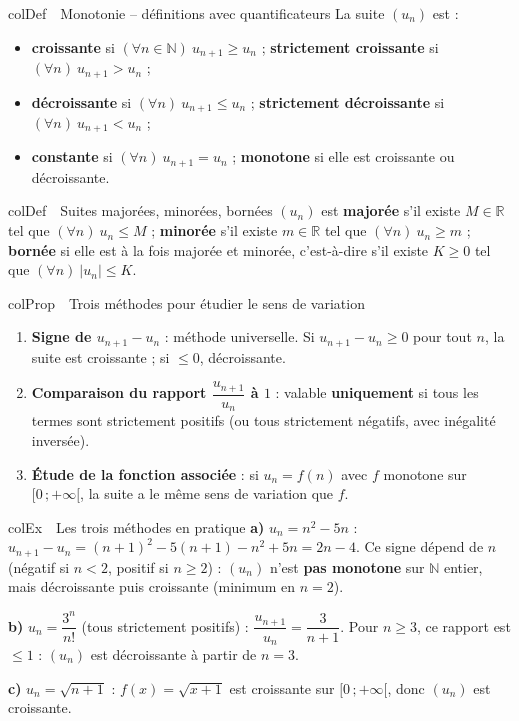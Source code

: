 \documentclass[11pt,a4paper]{article}
\newenvironment{definition}[1][Définition]
  {\begin{fiche}{colDef}{\ding{110}~~#1}}{\end{fiche}}
\newenvironment{propriete}[1][Propriété]
  {\begin{fiche}{colProp}{\ding{72}~~#1}}{\end{fiche}}
\newenvironment{exemple}[1][Exemple]
  {\begin{fiche}{colEx}{\ding{217}~~#1}}{\end{fiche}}
\begin{document}
\begin{definition}[Monotonie -- définitions avec quantificateurs]
La suite $(u_n)$ est :
\begin{itemize}[leftmargin=6mm, itemsep=0.5mm]
  \item \textbf{croissante} si $(\forall n \in \mathbb{N})\ u_{n+1} \geq u_n$ ; \textbf{strictement croissante} si $(\forall n)\ u_{n+1} > u_n$ ;
  \item \textbf{décroissante} si $(\forall n)\ u_{n+1} \leq u_n$ ; \textbf{strictement décroissante} si $(\forall n)\ u_{n+1} < u_n$ ;
  \item \textbf{constante} si $(\forall n)\ u_{n+1} = u_n$ ; \textbf{monotone} si elle est croissante ou décroissante.
\end{itemize}
\end{definition}

\begin{definition}[Suites majorées, minorées, bornées]
$(u_n)$ est \textbf{majorée} s'il existe $M \in \mathbb{R}$ tel que $(\forall n)\ u_n \leq M$ ; \textbf{minorée} s'il existe $m \in \mathbb{R}$ tel que $(\forall n)\ u_n \geq m$ ; \textbf{bornée} si elle est à la fois majorée et minorée, c'est-à-dire s'il existe $K \geq 0$ tel que $(\forall n)\ |u_n| \leq K$.
\end{definition}

\begin{propriete}[Trois méthodes pour étudier le sens de variation]
\begin{enumerate}[leftmargin=7mm, itemsep=0.5mm]
  \item \textbf{Signe de $u_{n+1} - u_n$} : méthode universelle. Si $u_{n+1} - u_n \geq 0$ pour tout $n$, la suite est croissante ; si $\leq 0$, décroissante.
  \item \textbf{Comparaison du rapport $\dfrac{u_{n+1}}{u_n}$ à $1$} : valable \textbf{uniquement} si tous les termes sont strictement positifs (ou tous strictement négatifs, avec inégalité inversée).
  \item \textbf{Étude de la fonction associée} : si $u_n = f(n)$ avec $f$ monotone sur $[0\,;+\infty[$, la suite a le même sens de variation que $f$.
\end{enumerate}
\end{propriete}

\begin{exemple}[Les trois méthodes en pratique]
\textbf{a)} $u_n = n^2 - 5n$ : $u_{n+1} - u_n = (n+1)^2 - 5(n+1) - n^2 + 5n = 2n - 4$. Ce signe dépend de $n$ (négatif si $n < 2$, positif si $n \geq 2$) : $(u_n)$ n'est \textbf{pas monotone} sur $\mathbb{N}$ entier, mais décroissante puis croissante (minimum en $n=2$).

\smallskip
\textbf{b)} $u_n = \dfrac{3^n}{n!}$ (tous strictement positifs) : $\dfrac{u_{n+1}}{u_n} = \dfrac{3}{n+1}$. Pour $n \geq 3$, ce rapport est $\leq 1$ : $(u_n)$ est décroissante à partir de $n = 3$.

\smallskip
\textbf{c)} $u_n = \sqrt{n+1}$ : $f(x) = \sqrt{x+1}$ est croissante sur $[0\,;+\infty[$, donc $(u_n)$ est croissante.
\end{exemple}
\end{document}

